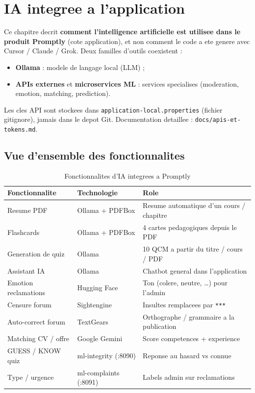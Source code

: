\chapter{IA integree a l'application}
\label{ch:app}

Ce chapitre decrit \textbf{comment l'intelligence artificielle est utilisee
dans le produit Promptly} (cote application), et non comment le code a ete
genere avec Cursor / Claude / Grok. Deux familles d'outils coexistent :
\begin{itemize}
  \item \textbf{Ollama} : modele de langage local (LLM) ;
  \item \textbf{APIs externes} et \textbf{microservices ML} : services
        specialises (moderation, emotion, matching, prediction).
\end{itemize}

Les cles API sont stockees dans
\texttt{application-local.properties} (fichier gitignore), jamais dans le
depot Git. Documentation detaillee : \texttt{docs/apis-et-tokens.md}.

\section{Vue d'ensemble des fonctionnalites}

\begin{table}[H]
\centering
\begin{tabular}{@{}p{3.8cm}p{4cm}p{5.2cm}@{}}
\toprule
Fonctionnalite & Technologie & Role \\
\midrule
Resume PDF & Ollama + PDFBox & Resume automatique d'un cours / chapitre \\
Flashcards & Ollama + PDFBox & 4 cartes pedagogiques depuis le PDF \\
Generation de quiz & Ollama & 10 QCM a partir du titre / cours / PDF \\
Assistant IA & Ollama & Chatbot general dans l'application \\
Emotion reclamations & Hugging Face & Ton (colere, neutre, \ldots) pour l'admin \\
Censure forum & Sightengine & Insultes remplacees par \texttt{***} \\
Auto-correct forum & TextGears & Orthographe / grammaire a la publication \\
Matching CV / offre & Google Gemini & Score competences + experience \\
GUESS / KNOW quiz & ml-integrity (:8090) & Reponse au hasard vs connue \\
Type / urgence & ml-complaints (:8091) & Labels admin sur reclamations \\
\bottomrule
\end{tabular}
\caption{Fonctionnalites d'IA integrees a Promptly}
\end{table}

